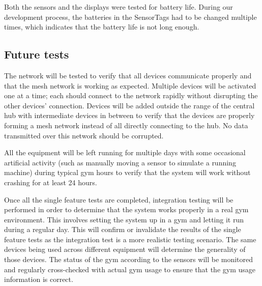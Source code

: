 \documentclass[PPFS.tex]{template/subfiles}
\begin{document}
Both the sensors and the displays were tested for battery life. During our development process, the batteries in the SensorTags had to be changed multiple times, which indicates that the battery life is not long enough.
\subsection{Future tests}

The network will be tested to verify that all devices communicate properly and that the mesh network is working as expected. Multiple devices will be activated one at a time; each should connect to the network rapidly without disrupting the other devices' connection. Devices will be added outside the range of the central hub with intermediate devices in between to verify that the devices are properly forming a mesh network instead of all directly connecting to the hub. No data transmitted over this network should be corrupted.

All the equipment will be left running for multiple days with some occasional artificial activity (such as manually moving a sensor to simulate a running machine) during typical gym hours to verify that the system will work without crashing for at least 24 hours.

Once all the single feature tests are completed, integration testing will be performed in order to determine that the system works properly in a real gym environment. This involves setting the system up in a gym and letting it run during a regular day. This will confirm or invalidate the results of the single feature tests as the integration test is a more realistic testing scenario. The same devices being used across different equipment will determine the generality of those devices. The status of the gym according to the sensors will be monitored and regularly cross-checked with actual gym usage to ensure that the gym usage information is correct.
\end{document}
